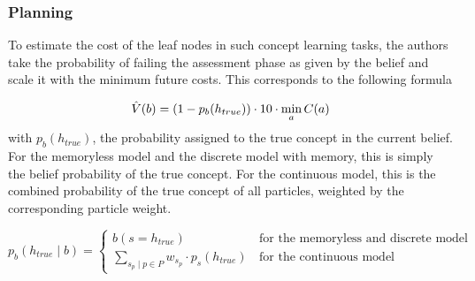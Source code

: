 \subsubsection{Planning}


To estimate the cost of the leaf nodes in such concept learning tasks, 
the authors take the probability of failing the assessment phase as given by the belief and scale it with the minimum future costs.
This corresponds to the following formula

\begin{equation}
    \Hat{V}(b) = (1 - p_b(h_{true})) \cdot 10 \cdot \min_a{C(a)}
    \label{eq:leaf-calc}
\end{equation}
with $p_b(h_{true})$, the probability assigned to the true concept in the current belief. 
For the memoryless model and the discrete model with memory, this is simply the belief probability of the true concept. 
For the continuous model, this is the combined probability of the true concept of all particles, weighted by the corresponding particle weight.

\begin{equation}
    p_b(h_{true} \mid b) = \begin{cases}
        b(s = h_{true}) & \, \text{for the memoryless and discrete model} \\
        \sum_{s_p \mid p \in P}{w_{s_p} \cdot p_s(h_{true})} & \, \text{for the continuous model}
    \end{cases}
\end{equation}



